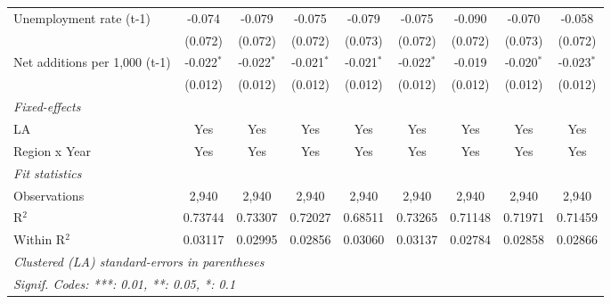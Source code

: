 \begin{table}[htbp]
\begin{tabular}{lcccccccc}
      Unemployment rate (t-1)       & -0.074        & -0.079        & -0.075        & -0.079        & -0.075         & -0.090         & -0.070         & -0.058\\   
                                    & (0.072)       & (0.072)       & (0.072)       & (0.073)       & (0.072)        & (0.072)        & (0.073)        & (0.072)\\   
      Net additions per 1,000 (t-1) & -0.022$^{*}$  & -0.022$^{*}$  & -0.021$^{*}$  & -0.021$^{*}$  & -0.022$^{*}$   & -0.019         & -0.020$^{*}$   & -0.023$^{*}$\\   
                                    & (0.012)       & (0.012)       & (0.012)       & (0.012)       & (0.012)        & (0.012)        & (0.012)        & (0.012)\\   
      \midrule
      \emph{Fixed-effects}\\
      LA                            & Yes           & Yes           & Yes           & Yes           & Yes            & Yes            & Yes            & Yes\\  
      Region x Year                 & Yes           & Yes           & Yes           & Yes           & Yes            & Yes            & Yes            & Yes\\  
      \midrule
      \emph{Fit statistics}\\
      Observations                  & 2,940         & 2,940         & 2,940         & 2,940         & 2,940          & 2,940          & 2,940          & 2,940\\  
      R$^2$                         & 0.73744       & 0.73307       & 0.72027       & 0.68511       & 0.73265        & 0.71148        & 0.71971        & 0.71459\\  
      Within R$^2$                  & 0.03117       & 0.02995       & 0.02856       & 0.03060       & 0.03137        & 0.02784        & 0.02858        & 0.02866\\  
      \midrule \midrule
      \multicolumn{9}{l}{\emph{Clustered (LA) standard-errors in parentheses}}\\
      \multicolumn{9}{l}{\emph{Signif. Codes: ***: 0.01, **: 0.05, *: 0.1}}\\
   \end{tabular}
\end{table}


